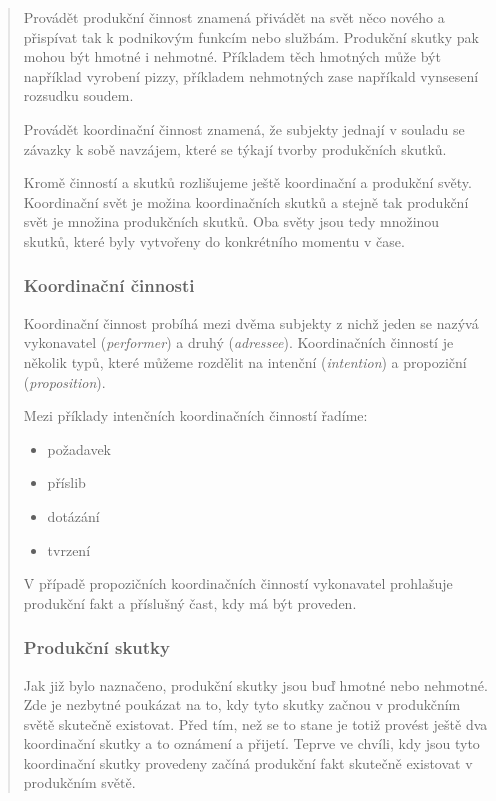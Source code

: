\documentclass[]{article}
\begin{document}
\begin{quote}
Provádět produkční činnost znamená přivádět na svět něco nového a přispívat tak k podnikovým funkcím nebo službám. Produkční skutky pak mohou být hmotné i nehmotné. Příkladem těch hmotných může být například vyrobení pizzy, příkladem nehmotných zase napříkald vynsesení rozsudku soudem.

Provádět koordinační činnost znamená, že subjekty jednají v souladu se závazky k sobě navzájem, které se týkají tvorby produkčních skutků.

Kromě činností a skutků rozlišujeme ještě koordinační a produkční světy. Koordinační svět je možina koordinačních skutků a stejně tak produkční svět je množina produkčních skutků. Oba světy jsou tedy množinou skutků, které byly vytvořeny do konkrétního momentu v čase.


\subsubsection{Koordinační činnosti}
Koordinační činnost probíhá mezi dvěma subjekty z nichž jeden se nazývá vykonavatel (\textit{performer}) a druhý (\textit{adressee}). Koordinačních činností je několik typů, které můžeme rozdělit na intenční (\textit{intention}) a propoziční (\textit{proposition}).

Mezi příklady intenčních koordinačních činností řadíme:

\begin{itemize}
\item požadavek
\item příslib
\item dotázání
\item tvrzení
\end{itemize}

V případě propozičních koordinačních činností vykonavatel prohlašuje produkční fakt a příslušný čast, kdy má být proveden. %


\subsubsection{Produkční skutky}
Jak již bylo naznačeno, produkční skutky jsou buď hmotné nebo nehmotné. Zde je nezbytné poukázat na to, kdy tyto skutky začnou v produkčním světě skutečně existovat. Před tím, než se to stane je totiž provést ještě dva koordinační skutky a to oznámení a přijetí. Teprve ve chvíli, kdy jsou tyto koordinační skutky provedeny začíná produkční fakt skutečně existovat v produkčním světě.


\end{quote}
\end{document}
